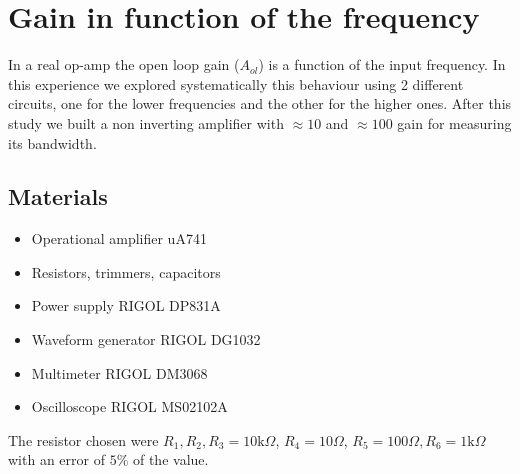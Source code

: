 \chapter{Gain in function of the frequency}
In a real op-amp the open loop gain ($A_{ol}$) is a function of the input frequency. In this experience we explored systematically this behaviour using 2 different circuits, one for the lower frequencies and the other for the higher ones. After this study we built a non inverting amplifier with $\approx 10$ and $\approx 100$ gain for measuring its bandwidth.

\section{Materials}
\begin{itemize}
\item Operational amplifier uA741
\item Resistors, trimmers, capacitors
\item Power supply RIGOL DP831A
\item Waveform generator RIGOL DG1032
\item Multimeter RIGOL DM3068
\item Oscilloscope RIGOL MS02102A
\end{itemize}
The resistor chosen were $R_1, R_2, R_3 = 10\text{k} \Omega$, $R_4 = 10 \Omega$, $R_5 = 100 \Omega, R_6 = 1\text{k}\Omega$ with an error of $5\%$ of the value.

